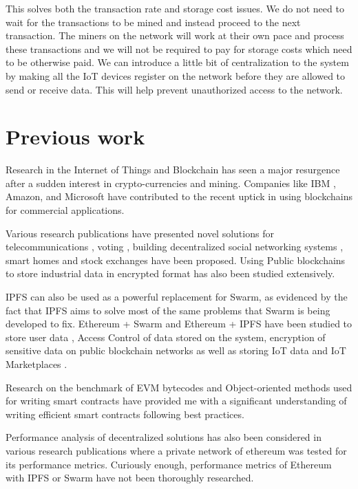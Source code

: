 \documentclass[11pt,openright]{report}
\begin{document}
This solves both the transaction rate and storage cost issues. We do not need to wait for the transactions to be mined and instead proceed to the next transaction. The miners on the network will work at their own pace and process these transactions and we will not be required to pay for storage costs which need to be otherwise paid. We can introduce a little bit of centralization to the system by making all the IoT devices register on the network before they are allowed to send or receive data. This will help prevent unauthorized access to the network.

\section{Previous work}\label{section:previouswork}
Research in the Internet of Things and Blockchain has seen a major resurgence after a sudden interest in crypto-currencies and mining. Companies like IBM \cite{Androulaki:2018:HFD:3190508.3190538}, Amazon, and Microsoft have contributed to the recent uptick in using blockchains for commercial applications. 

Various research publications have presented novel solutions for telecommunications \cite{8441204}, voting \cite{8603050}, building decentralized social networking systems \cite{8645058}, smart homes\cite{8644880} and stock exchanges \cite{8516610} have been proposed. Using Public blockchains to store industrial data in encrypted format has also been studied extensively\cite{8622246}.

IPFS can also be used as a powerful replacement for Swarm, as evidenced by the fact that IPFS aims to solve most of the same problems that Swarm is being developed to fix. Ethereum + Swarm and Ethereum + IPFS have been studied to store user data \cite{8448350}, Access Control of data \cite{8400511} stored on the system, encryption of sensitive data on public blockchain networks \cite{8400511} as well as storing IoT data \cite{8634961} and IoT Marketplaces \cite{8525388}.

Research on the benchmark of EVM bytecodes \cite{8612882} and Object-oriented methods used for writing smart contracts \cite{8445056} have provided me with a significant understanding of writing efficient smart contracts following best practices. 

Performance analysis of decentralized solutions has also been considered in various research publications \cite{8342866} where a private network of ethereum was tested for its performance metrics. Curiously enough, performance metrics of Ethereum with IPFS or Swarm have not been thoroughly researched. 
\end{document}
